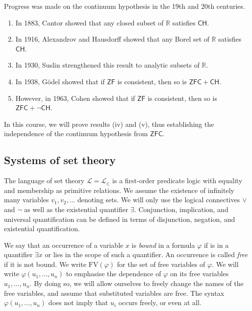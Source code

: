Progress was made on the continuum hypothesis in the 19th and 20th centuries.
\begin{enumerate}
    \item In 1883, Cantor showed that any closed subset of \( \mathbb R \) satisfies \( \mathsf{CH} \).
    \item In 1916, Alexandrov and Hausdorff showed that any Borel set of \( \mathbb R \) satisfies \( \mathsf{CH} \).
    \item In 1930, Suslin strengthened this result to analytic subsets of \( \mathbb R \).
    \item In 1938, G\"odel showed that if \( \mathsf{ZF} \) is consistent, then so is \( \mathsf{ZFC} + \mathsf{CH} \).
    \item However, in 1963, Cohen showed that if \( \mathsf{ZF} \) is consistent, then so is \( \mathsf{ZFC} + \neg\mathsf{CH} \).
\end{enumerate}
In this course, we will prove results (iv) and (v), thus establishing the independence of the continuum hypothesis from \( \mathsf{ZFC} \).

\subsection{Systems of set theory}
The language of set theory \( \mathcal L = \mathcal L_\in \) is a first-order predicate logic with equality and membership as primitive relations.
We assume the existence of infinitely many variables \( v_1, v_2, \dots \) denoting sets.
We will only use the logical connectives \( \vee \) and \( \neg \) as well as the existential quantifier \( \exists \).
Conjunction, implication, and universal quantification can be defined in terms of disjunction, negation, and existential quantification.

We say that an occurrence of a variable \( x \) is \emph{bound} in a formula \( \varphi \) if is in a quantifier \( \exists x \) or lies in the scope of such a quantifier.
An occurrence is called \emph{free} if it is not bound.
We write \( \mathrm{FV}(\varphi) \) for the set of free variables of \( \varphi \).
We will write \( \varphi(u_1, \dots, u_n) \) to emphasise the dependence of \( \varphi \) on its free variables \( u_1, \dots, u_n \).
By doing so, we will allow ourselves to freely change the names of the free variables, and assume that substituted variables are free.
The syntax \( \varphi(u_1, \dots, u_n) \) does not imply that \( u_i \) occurs freely, or even at all.

